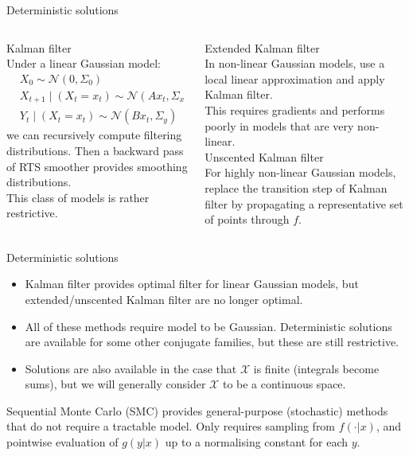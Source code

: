 \documentclass[aspectratio=169]{beamer}
\theoremstyle{definition}
\newcommand{\N}{\mathcal{N}}
\begin{document}
\begin{frame}{Deterministic solutions}
\begin{columns}
\begin{column}{0.45\textwidth}
{\Large Kalman filter \cite{kalman1960}}\\
Under a linear Gaussian model:
\begin{align*}
& X_0 \sim \N(0, \Sigma_0) \\
& X_{t+1} \mid (X_t = x_t) \sim \N(A x_t, \Sigma_x) \\
& Y_t \mid (X_t = x_t) \sim \N(B x_t, \Sigma_y)
\end{align*}
we can recursively compute filtering distributions. 
Then a backward pass of RTS smoother \cite{rauch1965} provides smoothing distributions.\\[7pt]
This class of models is rather restrictive.
\end{column}
\pause
\begin{column}{0.45\textwidth}
{\Large Extended Kalman filter \cite{jazwinski2007}}\\
In non-linear Gaussian models, use a local linear approximation and apply Kalman filter.\\[7pt]
This requires gradients and performs poorly in models that are very non-linear.\\[12pt]
\pause
{\Large Unscented Kalman filter \cite{wan2000}}\\
For highly non-linear Gaussian models, replace the transition step of Kalman filter by propagating a representative set of points through $f$.
\end{column}
\end{columns}
\end{frame}

\begin{frame}{Deterministic solutions}
\begin{itemize}
\item Kalman filter provides optimal filter for linear Gaussian models, but extended/unscented Kalman filter are no longer optimal.\\[7pt] %
\item All of these methods require model to be Gaussian.
Deterministic solutions are available for some other conjugate families, but these are still restrictive. \\[7pt]
\item Solutions are also available in the case that $\mathcal{X}$ is finite (integrals become sums), but we will generally consider $\mathcal{X}$ to be a continuous space. \\[7pt]
\end{itemize}
\pause
Sequential Monte Carlo (SMC) provides general-purpose (stochastic) methods that do not require a tractable model. Only requires sampling from $f(\cdot | x)$, and pointwise evaluation of $g(y | x)$ up to a normalising constant for each $y$.
\end{frame}
\end{document}
